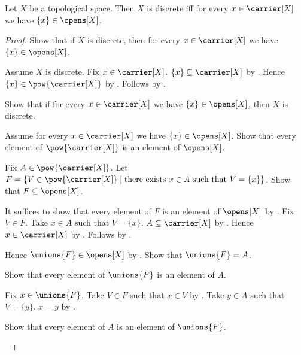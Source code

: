 \begin{theorem}\label{discrete_iff_every_singleton_open}
    Let $X$ be a topological space.
    Then $X$ is discrete iff for every $x\in\carrier[X]$ we have
        $\{x\}\in\opens[X]$.
\end{theorem}
\begin{proof}
    Show that if $X$ is discrete, then for every $x\in\carrier[X]$ we have
        $\{x\}\in\opens[X]$.
    \begin{subproof}
        Assume $X$ is discrete.
        Fix $x\in\carrier[X]$.
        $\{x\}\subseteq\carrier[X]$ by .
        Hence $\{x\}\in\pow{\carrier[X]}$ by .
        Follows by .
    \end{subproof}
    Show that if for every $x\in\carrier[X]$ we have
        $\{x\}\in\opens[X]$, then $X$ is discrete.
    \begin{subproof}
        Assume for every $x\in\carrier[X]$ we have
            $\{x\}\in\opens[X]$.
        Show that every element of $\pow{\carrier[X]}$ is an element of
            $\opens[X]$.
        \begin{subproof}
            Fix $A\in\pow{\carrier[X]}$.
            Let $F=\{V\in\pow{\carrier[X]}\mid
                \text{there exists $x\in A$ such that $V=\{x\}$}\}$.
            Show that $F\subseteq\opens[X]$.
            \begin{subproof}
                It suffices to show that every element of $F$ is an element of
                    $\opens[X]$ by .
                Fix $V\in F$.
                Take $x\in A$ such that $V=\{x\}$.
                $A\subseteq\carrier[X]$ by .
                Hence $x\in\carrier[X]$ by .
                Follows by \auto.
            \end{subproof}
            Hence $\unions{F}\in\opens[X]$ by .
            Show that $\unions{F}=A$.
            \begin{subproof}
                Show that every element of $\unions{F}$ is an element of $A$.
                \begin{subproof}
                    Fix $x\in\unions{F}$.
                    Take $V\in F$ such that $x\in V$ by .
                    Take $y\in A$ such that $V=\{y\}$.
                    $x=y$ by .
                \end{subproof}
                Show that every element of $A$ is an element of $\unions{F}$.

\end{subproof}
\end{subproof}
\end{subproof}
\end{proof}
